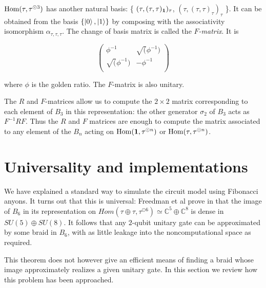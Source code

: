 $\operatorname{Hom}(\tau, \tau^{\odot 3})$ has another natural basis: \{ $(\tau,
(\tau,\tau)_{\mathbf{1}})_\tau$, $(\tau, (\tau,\tau)_\tau)_\tau$ \}. It can be obtained
from the basis $\left\{ \left|0\right>, \left|1\right> \right\}$ by composing with the
associativity isomorphism $\alpha_{\tau,\tau,\tau}$. The change of basis matrix
is called the \emph{$F$-matrix}. It is

\begin{equation}
\begin{pmatrix}
\phi^{-1} & \sqrt(\phi^{-1}) \\
\sqrt(\phi^{-1}) & -\phi^{-1} \\
\end{pmatrix}
\end{equation}

where $\phi$ is the golden ratio. The $F$-matrix is also unitary.

The $R$ and $F$-matrices allow us to compute the $2 \times 2$ matrix
corresponding to each element of $B_3$ in this representation: the other
generator $\sigma_2$ of $B_3$ acts as $F^{-1}RF$. Thus the $R$ and $F$
matrices are enough to compute the matrix associated to any element of the
$B_n$ acting on $\operatorname{Hom}(\mathbf{1}, \tau^{\odot n})$ or $\operatorname{Hom}(\tau, \tau^{\odot n})$.


\section{Universality and implementations}

We have explained a standard way to simulate the circuit model using
Fibonacci anyons. It turns out that this is universal:
Freedman et al prove in \cite{Freedman2000} that the image of
$B_6$ in its representation on $Hom(\tau \oplus \tau, \tau^{\odot 6}) \simeq
\mathbb{C}^5 \oplus \mathbb{C}^8$ is dense in $SU(5) \oplus SU(8)$. It follows
that any $2$-qubit unitary gate can be approximated by some braid in $B_6$,
with as little leakage into the noncomputational space as required. 


This theorem does not however give an efficient means of finding a braid whose
image approximately realizes a given unitary gate. In this section we review
how this problem has been approached.

